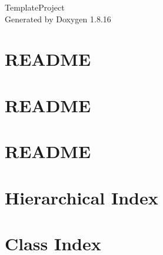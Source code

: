 \let\mypdfximage\pdfximage\def\pdfximage{\immediate\mypdfximage}\documentclass[twoside]{book}
\newcommand{\+}{\discretionary{\mbox{\scriptsize$\hookleftarrow$}}{}{}}
\newcommand{\clearemptydoublepage}{%
  \newpage{\pagestyle{empty}\cleardoublepage}%
}
\begin{document}
\hypersetup{pageanchor=false,
             bookmarksnumbered=true,
             pdfencoding=unicode
            }
\begin{titlepage}
\vspace*{7cm}
\begin{center}%
{\Large Template\+Project }\\
\vspace*{1cm}
{\large Generated by Doxygen 1.8.16}\\
\end{center}
\end{titlepage}
\clearemptydoublepage
{}
\tableofcontents
\clearemptydoublepage
{}
\hypersetup{pageanchor=true}

\chapter{R\+E\+A\+D\+ME}
\label{md__c_1__git_kraken_repos__template_repository_src_main_cpp_xmlcontrol__r_e_a_d_m_e}

\chapter{R\+E\+A\+D\+ME}
\label{md__c_1__git_kraken_repos__template_repository_src_main_cpp_xmlhw__r_e_a_d_m_e}

\chapter{R\+E\+A\+D\+ME}
\label{md__c_1__git_kraken_repos__template_repository_src_main_cpp_xmlmechdata__r_e_a_d_m_e}

\chapter{Hierarchical Index}

\chapter{Class Index}

\end{document}
